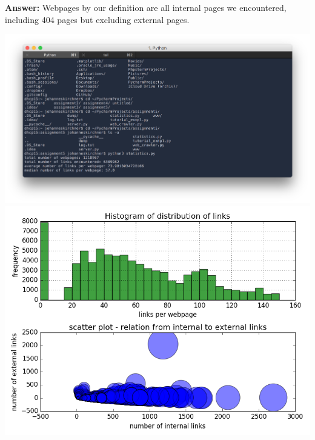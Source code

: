 \documentclass{WeSTassignment}
\begin{document}
\textbf{Answer:}
Webpages by our definition are all internal pages we encountered, including 404 pages but excluding external pages.

\hspace*{-100px}
\includegraphics[width=610px]{console_output}\\
\hspace*{-50px}
\includegraphics[width=510px]{figure_1}






\makefooter
\end{document}
